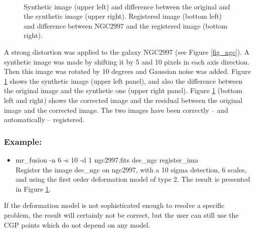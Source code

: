 \begin{figure}[htb]
\centerline{
\vbox{
\hbox{
}
\hbox{
}
}}
\caption{Synthetic image (upper left) and difference between the original 
and the synthetic image (upper right). Registered image (bottom left) 
and difference between NGC2997 and the registered image (bottom right). }
\label{fig_ngc_register}
\end{figure}

A strong distortion was applied to the galaxy NGC2997 (see 
Figure \ref{fig_ngc}). 
A synthetic image was made by shifting it by 5 and 10 pixels 
in each axis direction. Then this image
was rotated by 10 degrees and Gaussian noise was added. 
Figure \ref{fig_ngc_register} shows the synthetic image 
(upper left panel), and also the difference
between the original image and the synthetic one (upper right panel).
Figure \ref{fig_ngc_register} (bottom left and right) shows the 
corrected image and the residual between the original image 
and the corrected image.
The two images have been correctly -- and automatically -- registered.
\subsubsection*{Example:}
\begin{itemize}
\item mr\_fusion -n 6 -s 10 -d 1 ngc2997.fits  dec\_ngc  register\_ima\\ 
Register the image dec\_ngc on ngc2997, with a 10 sigma detection, 6 scales,
and using the first order deformation model of type 2. The 
result is presented
in Figure \ref{fig_ngc_register}.
\end{itemize}

\clearpage
\newpage

If the deformation model is not sophisticated enough to resolve a specific
problem, the result will certainly not be correct, but the user can still
use the CGP points which do not depend on any model.
